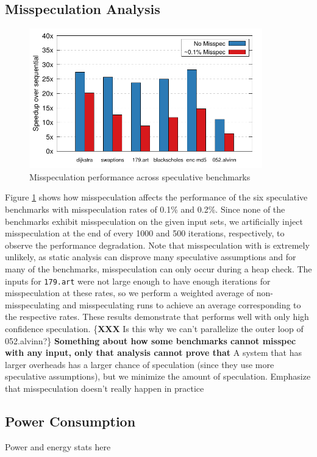 \subsection{Misspeculation Analysis}
\begin{figure}[htp]
  \includegraphics[width=0.9\textwidth]{figures/misspec}
  \caption{Misspeculation performance across speculative benchmarks}
  \label{fig:misspec}
\end{figure}
Figure \ref{fig:misspec} shows how misspeculation affects the
performance of the six speculative benchmarks with misspeculation rates of
0.1\% and 0.2\%. Since none of the benchmarks exhibit misspeculation on the
given input sets, we artificially inject misspeculation at the end of
every 1000 and 500 iterations, respectively, to observe the performance
degradation. Note that misspeculation with \name is extremely unlikely, as
static analysis can disprove many speculative assumptions and for many of
the benchmarks, misspeculation can only occur during a heap check.
The inputs for \texttt{179.art} were not large enough to have
enough iterations for misspeculation at these rates, so we perform a
weighted average of non-misspeculating and misspeculating runs to achieve
an average corresponding to the respective rates. These results demonstrate
that \name performs well with only high confidence speculation.
\{\textbf{XXX} Is this why we can't parallelize the outer loop of
052.alvinn?\} \textbf{Something about how some benchmarks cannot misspec
with any input, only that analysis cannot prove that} A system that has
larger overheads has a larger chance of speculation (since they use more
speculative assumptions), but we minimize the amount of speculation.
Emphasize that misspeculation doesn't really happen in practice

\subsection{Power Consumption}

Power and energy stats here

